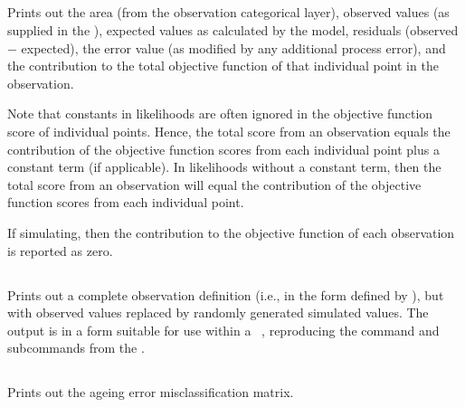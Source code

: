 \subsection{}

Prints out the area (from the observation categorical layer), observed values (as supplied in the \config), expected values as calculated by the model, residuals (observed $-$ expected), the error value (as modified by any additional process error), and the contribution to the total objective function of that individual point in the observation. 

Note that constants in likelihoods are often ignored in the objective function score of individual points. Hence, the total score from an observation equals the contribution of the objective function scores from each individual point plus a constant term (if applicable). In likelihoods without a constant term, then the total score from an observation will equal the contribution of the objective function scores from each individual point.

If simulating, then the contribution to the objective function of each observation is reported as zero. 

\subsection{}

Prints out a complete observation definition (i.e., in the form defined by ), but with observed values replaced by randomly generated simulated values. The output is in a form  suitable for use within a \SPM\ \config, reproducing the command and subcommands from the \config.

\subsection{}\label{sec:ageingerrorreport}

Prints out the ageing error misclassification matrix.

\subsection{}

